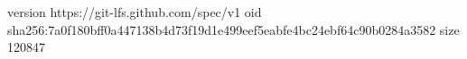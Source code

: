 version https://git-lfs.github.com/spec/v1
oid sha256:7a0f180bff0a447138b4d73f19d1e499eef5eabfe4bc24ebf64c90b0284a3582
size 120847
